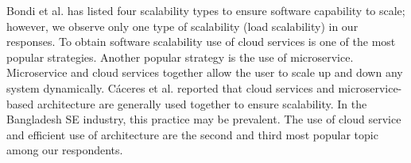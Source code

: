 

Bondi et al.\cite{Bondi2000} has listed four scalability types to ensure software capability to scale; however, we observe only one type of scalability (load scalability) in our responses. To obtain software scalability use of cloud services is one of the most popular strategies\cite{Gao2011}. Another popular strategy is the use of microservice. Microservice and cloud services together allow the user to scale up and down any system dynamically. Cáceres et al.\cite{Cceres2010} reported that cloud services and microservice-based architecture are generally used together to ensure scalability. In the Bangladesh SE industry, this practice may be prevalent. The use of cloud service and efficient use of architecture are the second and third most popular topic among our respondents.